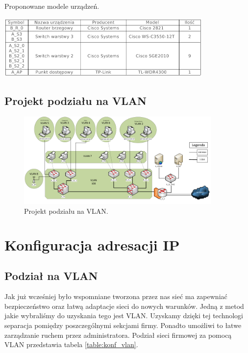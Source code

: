 \documentclass{report}
\begin{document}
\begin{table}[H]
\caption{Proponowane modele urządzeń.\label{table:proponowane_urzadzenia}}
 \centering
      \includegraphics[width=0.8\textwidth]{./obrazki/spis_przyrzadow.png}
\end{table}

\subsection{Projekt podziału na VLAN}
\begin{figure}[H]
  \centering
      \includegraphics[width=0.9\textwidth]{./obrazki/topo_vlan.png}
  \caption{Projekt podziału na VLAN.}
\end{figure}

\section{Konfiguracja adresacji IP}
\subsection{Podział na VLAN}
Jak już wcześniej było wspomniane tworzona przez nas sieć ma zapewniać bezpieczeństwo oraz łatwą adaptacje sieci do nowych warunków.
Jedną z metod jakie wybraliśmy do uzyskania tego jest VLAN. Uzyskamy dzięki tej technologi separacja pomiędzy poszczególnymi
sekcjami firmy. Ponadto umożliwi to łatwe zarządzanie ruchem przez administratora. Podział sieci firmowej za pomocą VLAN przedstawia tabela \ref{table:konf_vlan}.
\end{document}
